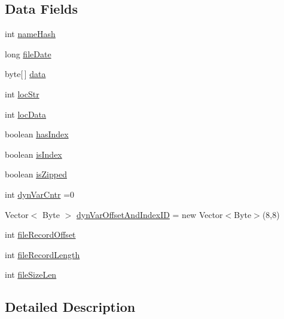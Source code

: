 \subsection*{Data Fields}
\begin{DoxyCompactItemize}
\item 
int \hyperlink{class_microchip_m_p_f_s_1_1_m_p_f_s_file_record_ae0b29673435605296b85236b55a5fea2}{name\+Hash}
\item 
long \hyperlink{class_microchip_m_p_f_s_1_1_m_p_f_s_file_record_a49c366ce7b147dbb88420df6ed5c001f}{file\+Date}
\item 
byte\mbox{[}$\,$\mbox{]} \hyperlink{class_microchip_m_p_f_s_1_1_m_p_f_s_file_record_a0ad80c378fb4b5fe4bc8a855302c4ae1}{data}
\item 
int \hyperlink{class_microchip_m_p_f_s_1_1_m_p_f_s_file_record_a85378a3f33fadd8d84c85f1da7519ce5}{loc\+Str}
\item 
int \hyperlink{class_microchip_m_p_f_s_1_1_m_p_f_s_file_record_a3f3e43ea3cf371aca7a3f87a7cf827c9}{loc\+Data}
\item 
boolean \hyperlink{class_microchip_m_p_f_s_1_1_m_p_f_s_file_record_acaf5e0de9e09b312ffddf9c0640461bd}{has\+Index}
\item 
boolean \hyperlink{class_microchip_m_p_f_s_1_1_m_p_f_s_file_record_ae489c66ab0cfc438757afca42c2f3dd4}{is\+Index}
\item 
boolean \hyperlink{class_microchip_m_p_f_s_1_1_m_p_f_s_file_record_ae9137086b445eab96d5d68ff2e9030c6}{is\+Zipped}
\item 
int \hyperlink{class_microchip_m_p_f_s_1_1_m_p_f_s_file_record_a68d8acf8ef47284c957c48250991a68a}{dyn\+Var\+Cntr} =0
\item 
Vector$<$ Byte $>$ \hyperlink{class_microchip_m_p_f_s_1_1_m_p_f_s_file_record_afc4f2d00ba61b085fb16b0835f098957}{dyn\+Var\+Offset\+And\+Index\+I\+D} = new Vector$<$Byte$>$(8,8)
\item 
int \hyperlink{class_microchip_m_p_f_s_1_1_m_p_f_s_file_record_a6da2ebf4eef0b779d70a78ad1e3ee216}{file\+Record\+Offset}
\item 
int \hyperlink{class_microchip_m_p_f_s_1_1_m_p_f_s_file_record_a4e1de17cbbd6116d5cae36ae56242b37}{file\+Record\+Length}
\item 
int \hyperlink{class_microchip_m_p_f_s_1_1_m_p_f_s_file_record_a3dcd14e5174e5330ead991d838151d0d}{file\+Size\+Len}
\end{DoxyCompactItemize}


\subsection{Detailed Description}


